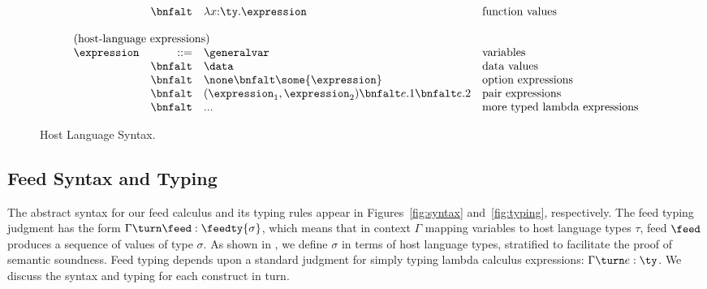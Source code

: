\begin{figure}[t]
\[\begin{array}{lrll}
& \bnfalt & \lambda x{:}\ty.\expression & \mbox{function values} \\
\\
\multicolumn{4}{l}{\mbox{(host-language expressions)}}\\ 
\expression & ::= & \generalvar & \mbox{variables} \\
 & \bnfalt & \data & \mbox{data values} \\
 & \bnfalt & \none \bnfalt 
              \some{\expression} & \mbox{option expressions}\\
 & \bnfalt & (\expression_1,\expression_2) \bnfalt e.1 \bnfalt e.2 
    & \mbox{pair expressions} \\
 & \bnfalt & ... & \mbox{more typed lambda expressions} \\
\end{array}
\]
\caption{Host Language Syntax.}
\label{fig:host-language}
\end{figure}


\subsection{Feed Syntax and Typing}

The abstract syntax for our feed calculus and its typing rules appear
in Figures~\ref{fig:syntax} and~\ref{fig:typing}, respectively.  The
feed typing judgment has the form $\Gamma \turn \feed :
\feedty{\sigma}$, which means that in context $\Gamma$ mapping
variables to host language types $\tau$, feed $\feed$ produces a
sequence of values of type $\sigma$.  As shown in ,
we define $\sigma$ in terms of host language types, stratified to
facilitate the proof of semantic soundness.  Feed typing depends upon
a standard judgment for simply typing lambda calculus expressions:
$\Gamma \turn e : \ty$.  We discuss the syntax and typing for each
construct in turn.

